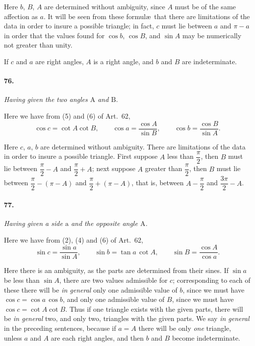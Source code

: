 \documentclass{book}[2004/02/16]
\begin{document}
\begin{mainmatter}
\begin{spacing}{1.3}
Here $b$, $B$, $A$ are determined without ambiguity, since $A$ must
be of the same affection as $a$. It will be seen from these formul\ae\
that there are limitations of the data in order to insure a possible
triangle; in fact, $c$ must lie between $a$ and $\pi - a$ in order that the
values found for $\cos b$, $\cos B$, and $\sin A$ may be numerically not
greater than unity.

If $c$ and $a$ are right angles, $A$ is a right angle, and $b$ and $B$ are
indeterminate.

\paragraph{76.} \textit{Having given the two angles $\mathrm{A}$ and $\mathrm{B}$.}

Here we have from (5) and (6) of Art.\ 62,
\[
\cos c = \cot A \cot B, \qquad
\cos a = \frac{\cos A}{\sin B}, \qquad
\cos b = \frac{\cos B}{\sin A}.
\]

Here $c$, $a$, $b$ are determined without ambiguity. There are
limitations of the data in order to insure a possible triangle. First
suppose $A$ less than $\dfrac{\pi}{2}$, then $B$ must lie between $\dfrac{\pi}{2} - A$ and $\dfrac{\pi}{2} + A$;
next suppose $A$ greater than $\dfrac{\pi}{2}$, then $B$ must lie between
$\dfrac{\pi}{2} - (\pi - A)$ and
$\dfrac{\pi}{2} + (\pi - A)$, that is, between
$A - \dfrac{\pi}{2}$ and $\dfrac{3\pi}{2} - A$.

\paragraph{77.} \textit{Having given a side $\mathrm a$ and the opposite angle $\mathrm A$.}

Here we have from (2), (4) and (6) of Art.\ 62,
\[
\sin c = \dfrac{\sin a}{\sin A}, \qquad
\sin b = \tan a\, \cot A, \qquad
\sin B = \dfrac{\cos A}{\cos a}.
\]

Here there is an ambiguity, as the parts are determined from
their sines. If $\sin a$ be less than $\sin A$, there are two values
admissible for $c$; corresponding to each of these there will be
\textit{in general} only one admissible value of $b$, since we must have
$\cos c = \cos a\, \cos b$, and only one admissible value of $B$, since we
must have $\cos c = \cot A \cot B$. Thus if one triangle exists with the
given parts, there will be \textit{in general} two, and only two, triangles
with the given parts. We say \textit{in general} in the preceding sentences,
because if $a = A$ there will be only \textit{one} triangle, unless $a$
and $A$ are each right angles, and then $b$ and $B$ become indeterminate.


\end{spacing}
\end{mainmatter}
\end{document}
